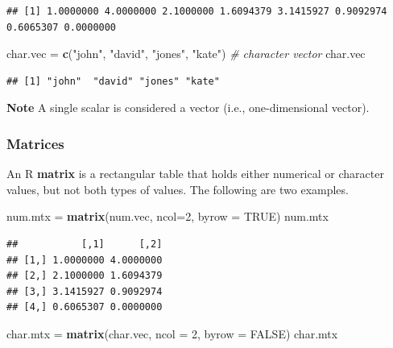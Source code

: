 \documentclass[
]{book}
\newenvironment{Shaded}{\begin{snugshade}}{\end{snugshade}}
\newcommand{\AttributeTok}[1]{\textcolor[rgb]{0.13,0.29,0.53}{#1}}
\newcommand{\CommentTok}[1]{\textcolor[rgb]{0.56,0.35,0.01}{\textit{#1}}}
\newcommand{\ConstantTok}[1]{\textcolor[rgb]{0.56,0.35,0.01}{#1}}
\newcommand{\DecValTok}[1]{\textcolor[rgb]{0.00,0.00,0.81}{#1}}
\newcommand{\FunctionTok}[1]{\textcolor[rgb]{0.13,0.29,0.53}{\textbf{#1}}}
\newcommand{\NormalTok}[1]{#1}
\newcommand{\OtherTok}[1]{\textcolor[rgb]{0.56,0.35,0.01}{#1}}
\newcommand{\StringTok}[1]{\textcolor[rgb]{0.31,0.60,0.02}{#1}}
\begin{document}
\begin{verbatim}
## [1] 1.0000000 4.0000000 2.1000000 1.6094379 3.1415927 0.9092974 0.6065307 0.0000000
\end{verbatim}

\begin{Shaded}
\begin{Highlighting}[]
\NormalTok{char.vec }\OtherTok{=} \FunctionTok{c}\NormalTok{(}\StringTok{"john"}\NormalTok{, }\StringTok{"david"}\NormalTok{, }\StringTok{"jones"}\NormalTok{, }\StringTok{"kate"}\NormalTok{)           }\CommentTok{\# character vector}
\NormalTok{char.vec}
\end{Highlighting}
\end{Shaded}

\begin{verbatim}
## [1] "john"  "david" "jones" "kate"
\end{verbatim}

\textbf{Note} A single scalar is considered a vector (i.e., one-dimensional vector).

\hypertarget{matrices}{%
\subsubsection{Matrices}\label{matrices}}

An R \textbf{matrix} is a rectangular table that holds either numerical or character values, but not both types of values. The following are two examples.

\begin{Shaded}
\begin{Highlighting}[]
\NormalTok{num.mtx }\OtherTok{=} \FunctionTok{matrix}\NormalTok{(num.vec, }\AttributeTok{ncol=}\DecValTok{2}\NormalTok{, }\AttributeTok{byrow =} \ConstantTok{TRUE}\NormalTok{)}
\NormalTok{num.mtx}
\end{Highlighting}
\end{Shaded}

\begin{verbatim}
##           [,1]      [,2]
## [1,] 1.0000000 4.0000000
## [2,] 2.1000000 1.6094379
## [3,] 3.1415927 0.9092974
## [4,] 0.6065307 0.0000000
\end{verbatim}

\begin{Shaded}
\begin{Highlighting}[]
\NormalTok{char.mtx }\OtherTok{=} \FunctionTok{matrix}\NormalTok{(char.vec, }\AttributeTok{ncol =} \DecValTok{2}\NormalTok{, }\AttributeTok{byrow =} \ConstantTok{FALSE}\NormalTok{)}
\NormalTok{char.mtx}
\end{Highlighting}
\end{Shaded}
\end{document}
